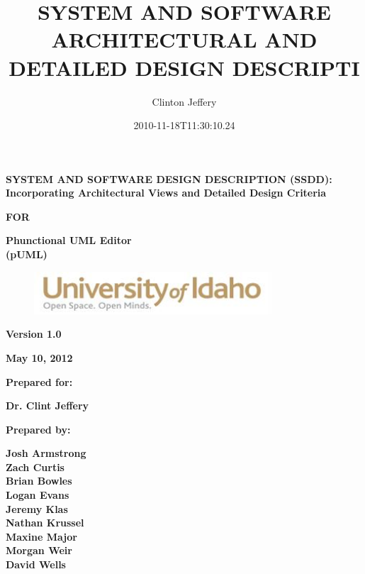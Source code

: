 \documentclass[twoside,letterpaper]{article}
\title{SYSTEM AND SOFTWARE ARCHITECTURAL AND DETAILED DESIGN DESCRIPTI}
\author{Clinton Jeffery}
\date{2010-11-18T11:30:10.24}
\begin{document}
\clearpage

{\centering{}\bfseries\color{black}
SYSTEM AND SOFTWARE DESIGN DESCRIPTION (SSDD): Incorporating
Architectural Views and Detailed Design Criteria
\par}

{\centering{}\bfseries\color{black}
FOR
\par}

\bigskip

{\centering{}\bfseries\color{black}
Phunctional UML Editor
\\(pUML)
\par}


\bigskip


\bigskip


\bigskip

\begin{figure}
\centering
\includegraphics[width=3.5in]{uidahologo.jpg}
\end{figure}

\bigskip

\bigskip

{\centering\bfseries Version 1.0 
\par}

{\centering\bfseries May 10, 2012 
\par}

\bigskip


\bigskip

{\centering\bfseries Prepared for: 
\par}

{\centering\bfseries Dr. Clint Jeffery
\par}

\bigskip


\bigskip

{\centering\bfseries Prepared by:
\par}

{\centering\bfseries
  Josh Armstrong
\\Zach Curtis
\\Brian Bowles
\\Logan Evans
\\Jeremy Klas
\\Nathan Krussel
\\Maxine Major
\\Morgan Weir
\\David Wells
\par}
\end{document}
